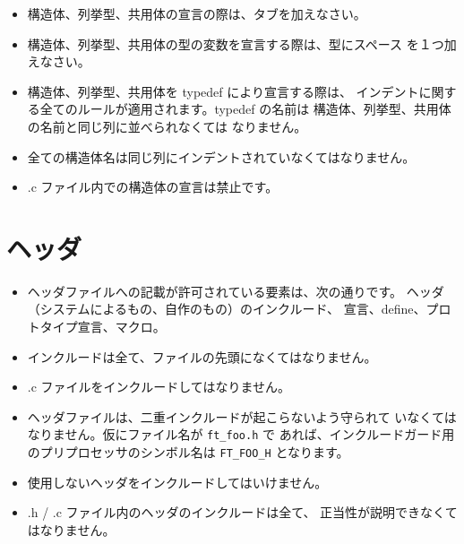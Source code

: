 \documentclass{42-ja}
\begin{document}
        \begin{itemize}

            \item 構造体、列挙型、共用体の宣言の際は、タブを加えなさい。

            \item 構造体、列挙型、共用体の型の変数を宣言する際は、型にスペース
				を１つ加えなさい。

            \item 構造体、列挙型、共用体を typedef により宣言する際は、
				インデントに関する全てのルールが適用されます。typedef の名前は
				構造体、列挙型、共用体の名前と同じ列に並べられなくては
				なりません。

            \item 全ての構造体名は同じ列にインデントされていなくてはなりません。

            \item .c ファイル内での構造体の宣言は禁止です。

        \end{itemize}
        \newpage


    \section{ヘッダ}

        \begin{itemize}

            \item ヘッダファイルへの記載が許可されている要素は、次の通りです。
				ヘッダ（システムによるもの、自作のもの）のインクルード、
				宣言、define、プロトタイプ宣言、マクロ。

            \item インクルードは全て、ファイルの先頭になくてはなりません。

            \item .c ファイルをインクルードしてはなりません。

            \item ヘッダファイルは、二重インクルードが起こらないよう守られて
				いなくてはなりません。仮にファイル名が \texttt{ft\_foo.h} で
				あれば、インクルードガード用のプリプロセッサのシンボル名は
				\texttt{FT\_FOO\_H} となります。

            \item 使用しないヘッダをインクルードしてはいけません。

            \item .h / .c ファイル内のヘッダのインクルードは全て、
				正当性が説明できなくてはなりません。

        \end{itemize}
\end{document}
